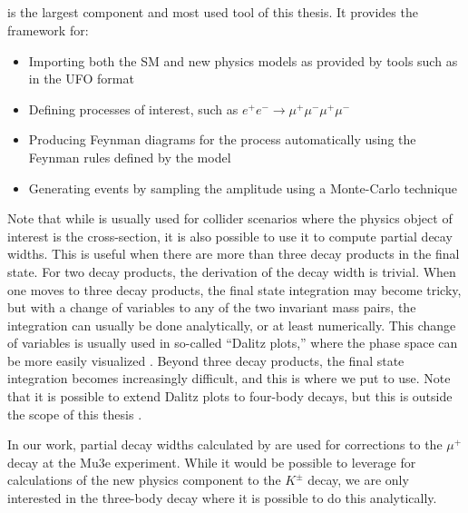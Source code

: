 \subsection{\madgraph}
\madgraph is the largest component and most used tool of this thesis.
It provides the framework for:
\begin{itemize}
    \item Importing both the SM and new physics models as provided by tools such as \feynrules in the UFO format
    \item Defining processes of interest, such as $e^+ e^- \rightarrow \mu^+ \mu^- \mu^+ \mu^-$
    \item Producing Feynman diagrams for the process automatically using the Feynman rules defined by the model
    \item Generating events by sampling the amplitude using a Monte-Carlo technique
\end{itemize}

Note that while \madgraph is usually used for collider scenarios where the physics object of interest is the cross-section, it is also possible to use it to compute partial decay widths.
This is useful when there are more than three decay products in the final state.
For two decay products, the derivation of the decay width is trivial.
When one moves to three decay products, the final state integration may become tricky, but with a change of variables to any of the two invariant mass pairs, the integration can usually be done analytically, or at least numerically.
This change of variables is usually used in so-called ``Dalitz plots,'' where the phase space can be more easily visualized \cite{Agashe:2014kda}.
Beyond three decay products, the final state integration becomes increasingly difficult, and this is where we put \madgraph to use.
Note that it is possible to extend Dalitz plots to four-body decays, but this is outside the scope of this thesis \cite{2007JPhB...40.3091S}.

In our work, partial decay widths calculated by \madgraph are used for corrections to the $\mu^+$ decay at the Mu3e experiment.
While it would be possible to leverage \madgraph for calculations of the new physics component to the $K^\pm$ decay, we are only interested in the three-body decay where it is possible to do this analytically.

